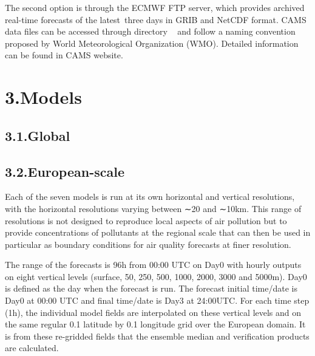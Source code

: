 \documentclass[9pt]{report}
\begin{document}
The second option is through the ECMWF FTP server, which provides archived real-time forecasts of the latest three days in GRIB and NetCDF format.
CAMS data files can be accessed through directory ~ and follow a naming convention proposed by World Meteorological Organization (WMO). 
Detailed information can be found in CAMS website.%

\section{3.\hspace*{0.5em}Models}\label{sec-models}%

\subsection{3.1.\hspace*{0.5em}Global}\label{sec-global}%

\subsection{3.2.\hspace*{0.5em}European-scale}\label{sec-european-scale}%

\noindent{}Each of the seven models is run at its own horizontal and vertical resolutions, with the horizontal resolutions varying between ∼20 and ∼10km. 
This range of resolutions is not designed to reproduce local aspects of air pollution but to provide concentrations of pollutants at the regional scale that can then be used in particular as boundary conditions for air quality forecasts at finer resolution.%

The range of the forecasts is 96h from 00:00 UTC on Day0 with hourly outputs on eight vertical levels (surface, 50, 250, 500, 1000, 2000, 3000 and 5000m). 
Day0 is defined as the day when the forecast is run. 
The forecast initial time/date is Day0 at 00:00 UTC and final time/date is Day3 at 24:00UTC. 
For each time step (1h), the individual model fields are interpolated on these vertical levels and on the same regular 0.1\textdegree{} latitude by 0.1\textdegree{} longitude grid over the European domain. 
It is from these re-gridded fields that the ensemble median and verification products are calculated.%
\end{document}
